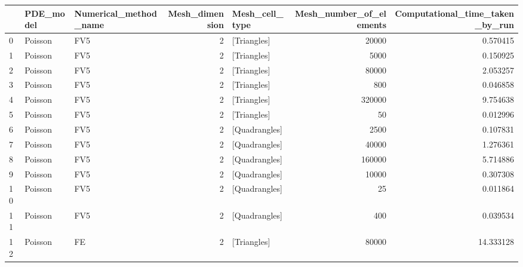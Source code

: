 \begin{tabular}{lllrlrr}
\toprule
{} & PDE\_model & Numerical\_method\_name &  Mesh\_dimension & Mesh\_cell\_type &  Mesh\_number\_of\_elements &  Computational\_time\_taken\_by\_run \\
\midrule
0  &   Poisson &                   FV5 &               2 &    [Triangles] &                    20000 &                         0.570415 \\
1  &   Poisson &                   FV5 &               2 &    [Triangles] &                     5000 &                         0.150925 \\
2  &   Poisson &                   FV5 &               2 &    [Triangles] &                    80000 &                         2.053257 \\
3  &   Poisson &                   FV5 &               2 &    [Triangles] &                      800 &                         0.046858 \\
4  &   Poisson &                   FV5 &               2 &    [Triangles] &                   320000 &                         9.754638 \\
5  &   Poisson &                   FV5 &               2 &    [Triangles] &                       50 &                         0.012996 \\
6  &   Poisson &                   FV5 &               2 &  [Quadrangles] &                     2500 &                         0.107831 \\
7  &   Poisson &                   FV5 &               2 &  [Quadrangles] &                    40000 &                         1.276361 \\
8  &   Poisson &                   FV5 &               2 &  [Quadrangles] &                   160000 &                         5.714886 \\
9  &   Poisson &                   FV5 &               2 &  [Quadrangles] &                    10000 &                         0.307308 \\
10 &   Poisson &                   FV5 &               2 &  [Quadrangles] &                       25 &                         0.011864 \\
11 &   Poisson &                   FV5 &               2 &  [Quadrangles] &                      400 &                         0.039534 \\
12 &   Poisson &                    FE &               2 &    [Triangles] &                    80000 &                        14.333128 \\

\end{tabular}
